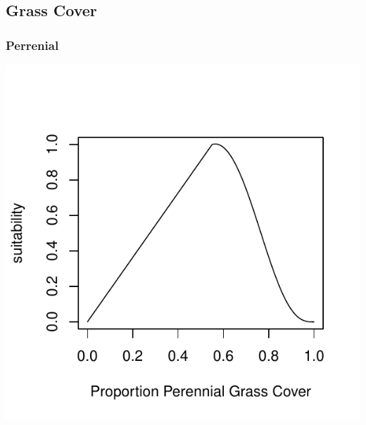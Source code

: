\documentclass[12pt,letterpaper]{article}\usepackage{graphicx, color}
\makeatletter
\def\maxwidth{ %
  \ifdim\Gin@nat@width>\linewidth
    \linewidth
  \else
    \Gin@nat@width
  \fi
}
\newenvironment{knitrout}{}{} %
\makeatother
\begin{document}
\subsection{Grass Cover}
\subsubsection{Perrenial}
\begin{knitrout}
\color{fgcolor}\includegraphics[width=\maxwidth]{figure/Sally-Dan_Grass_Cover_p} 
\end{knitrout}
\end{document}
